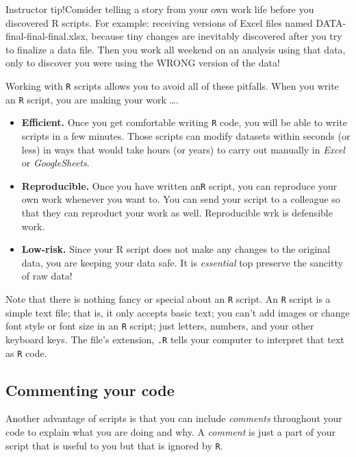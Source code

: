\documentclass[
]{book}
\begin{document}
Instructor tip!Consider telling a story from your own work life before you discovered R scripts. For example: receiving versions of Excel files named DATA-final-final-final.xlsx, because tiny changes are inevitably discovered after you try to finalize a data file. Then you work all weekend on an analysis using that data, only to discover you were using the WRONG version of the data!

Working with \texttt{R} scripts allows you to avoid all of these pitfalls. When you write an \texttt{R} script, you are making your work \ldots.

\begin{itemize}
\item
  \textbf{Efficient.} Once you get comfortable writing \texttt{R} code, you will be able to write scripts in a few minutes. Those scripts can modify datasets within seconds (or less) in ways that would take hours (or years) to carry out manually in \emph{Excel} or \emph{GoogleSheets}.
\item
  \textbf{Reproducible.} Once you have written an\texttt{R} script, you can reproduce your own work whenever you want to. You can send your script to a colleague so that they can reproduct your work as well. Reproducible wrk is defensible work.
\item
  \textbf{Low-risk.} Since your R script does not make any changes to the original data, you are keeping your data safe. It is \emph{essential} top preserve the sancitty of raw data!
\end{itemize}

Note that there is nothing fancy or special about an \texttt{R} script. An \texttt{R} script is a simple text file; that is, it only accepts basic text; you can't add images or change font style or font size in an \texttt{R} script; just letters, numbers, and your other keyboard keys. The file's extension, \texttt{.R} tells your computer to interpret that text as \texttt{R} code.

\hypertarget{commenting-your-code}{%
\subsection*{Commenting your code}\label{commenting-your-code}}

Another advantage of scripts is that you can include \emph{comments} throughout your code to explain what you are doing and why. A \emph{comment} is just a part of your script that is useful to you but that is ignored by \texttt{R}.
\end{document}
